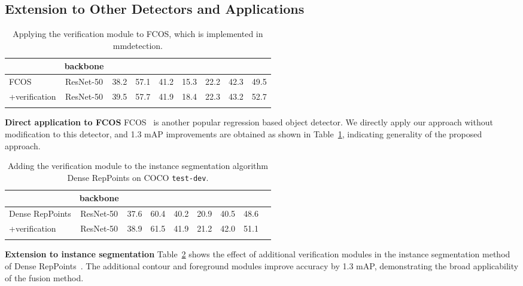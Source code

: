 \documentclass{article}
\begin{document}
\subsection{Extension to Other Detectors and Applications}

\begin{table}
  \caption{Applying the verification module to FCOS, which is implemented in mmdetection.}
  \small
  \label{tab:asfcos}
  \centering
  \begin{tabular}{lcccccccc}
    \Xhline{1.0pt}
    & backbone &  &  &  &  &  &  & \\
    \hline
    FCOS & ResNet-50 & 38.2 & 57.1 & 41.2 & 15.3 & 22.2 & 42.3 & 49.5\\
    +verification & ResNet-50 & 39.5 & 57.7 & 41.9 & 18.4 & 22.3 & 43.2 & 52.7\\
    \Xhline{1.0pt}
  \end{tabular}
  \vspace{-1em}
\end{table}

\textbf{Direct application to FCOS} FCOS~\cite{tian2019fcos} is another popular regression based object detector. We directly apply our approach without modification to this detector, and 1.3 mAP improvements are obtained as shown in Table~\ref{tab:asfcos}, indicating generality of the proposed approach.
 
\begin{table}
  \caption{Adding the verification module to the instance segmentation algorithm Dense RepPoints on COCO \texttt{test-dev}.}
  \small
  \label{tab:insseg}
  \centering
  \begin{tabular}{lcccccccc}
    \Xhline{1.0pt}
     & backbone &  &  &  &  &  & \\
    \hline
    Dense RepPoints & ResNet-50 & 37.6 & 60.4 & 40.2 & 20.9 & 40.5 & 48.6\\
    +verification & ResNet-50 & 38.9 & 61.5 & 41.9 & 21.2 & 42.0 & 51.1\\
    \Xhline{1.0pt}
  \end{tabular}
\end{table}

\textbf{Extension to instance segmentation} Table~\ref{tab:insseg} shows the effect of additional verification modules in the instance segmentation method of Dense RepPoints~\cite{yang19densereppts}. The additional contour and foreground modules improve accuracy by 1.3 mAP, demonstrating the broad applicability of the fusion method.
\end{document}
